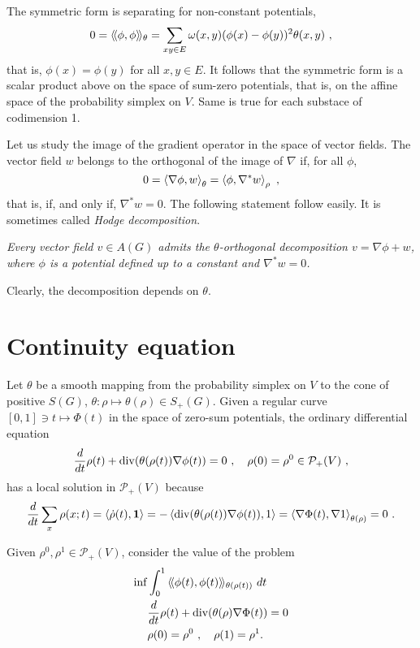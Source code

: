 \documentclass[12pt,a4paper]{amsart}
\theoremstyle{definition}
\begin{document}
The symmetric form is separating for non-constant potentials,
\begin{equation*}
  0 = \Scalarat \theta \phi \phi = \sum_{xy \in E} \omega(x,y)
  (\phi(x) - \phi(y))^2 \theta(x,y) \ , 
\end{equation*}
that is, $\phi(x) = \phi(y)$ for all $x,y \in E$. It follows that the
symmetric form is a scalar product above on the space of sum-zero
potentials, that is, on the affine space of the probability simplex on
$V$. Same is true for each substace of codimension 1.

Let us study the image of the gradient operator in the space of vector
fields. The vector field $w$ belongs to the  orthogonal of the image of
$\nabla$ if, for all $\phi$,
\begin{equation*}
  0 = \scalarat \theta {\nabla \phi} w = \scalarat \rho \phi {\nabla^* w} \ ,
\end{equation*}
that is, if, and only if, $\nabla^* w  = 0$. The following
statement follow easily. It is sometimes called \emph{Hodge decomposition}.

\emph{Every vector field $v \in A(G)$ admits the $\theta$-orthogonal
  decomposition $v = \nabla \phi + w$, where $\phi$ is a potential
  defined up to a constant and $\nabla^* w = 0$.}

Clearly, the decomposition depends on $\theta$.

\section{Continuity equation}
\label{sec:continuity}

Let $\theta$ be a smooth mapping from the probability simplex on $V$ to the
cone of positive $S(G)$, $\theta \colon \rho \mapsto \theta(\rho) \in
S_+(G)$. Given a regular curve $[0,1] \ni t \mapsto \Phi(t)$ in the
space of zero-sum potentials, the ordinary differential equation
\begin{equation*}
  \derivby t \rho(t) +  \Div(\theta(\rho(t))\nabla \phi(t)) = 0 \ , \quad
  \rho(0) = \rho^0 \in \mathcal P_+(V) \ ,
\end{equation*}
has a local solution in $\mathcal P_+(V)$ because
\begin{equation*}
  \derivby t \sum_x \rho(x;t) = \scalarof {\dot \rho(t)}{\one} = 
 - \scalarof {\Div(\theta(\rho(t))\nabla \phi(t))}{1} = \scalarat
 {\theta(\rho)} {\nabla \Phi(t)}{\nabla 1}
 = 0 \ .
\end{equation*}

Given $\rho^0, \rho^1 \in \mathcal P_+(V)$, consider the value of the problem
\begin{align*}
 \inf &\int_0^1 \Scalarat {\theta(\rho(t))} {\phi(t)}{\phi(t)} \ dt
 \\
 &\derivby t \rho(t) +  \Div(\theta(\rho)\nabla \Phi(t)) = 0 \\
 &\rho(0) = \rho^0 \ , \quad \rho(1) = \rho^1.
\end{align*}
\end{document}
